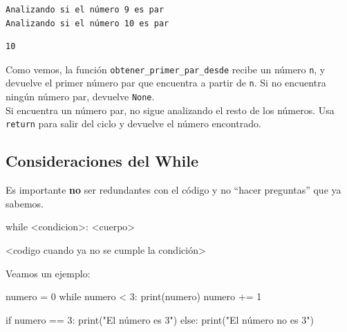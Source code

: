 \documentclass[
  letterpaper,
  DIV=11,
  numbers=noendperiod]{scrreprt}
\newenvironment{Shaded}{\begin{snugshade}}{\end{snugshade}}
\newcommand{\BuiltInTok}[1]{\textcolor[rgb]{0.00,0.23,0.31}{#1}}
\newcommand{\ControlFlowTok}[1]{\textcolor[rgb]{0.00,0.23,0.31}{#1}}
\newcommand{\DecValTok}[1]{\textcolor[rgb]{0.68,0.00,0.00}{#1}}
\newcommand{\NormalTok}[1]{\textcolor[rgb]{0.00,0.23,0.31}{#1}}
\newcommand{\OperatorTok}[1]{\textcolor[rgb]{0.37,0.37,0.37}{#1}}
\newcommand{\StringTok}[1]{\textcolor[rgb]{0.13,0.47,0.30}{#1}}
\begin{document}
\begin{verbatim}
Analizando si el número 9 es par
Analizando si el número 10 es par
\end{verbatim}

\begin{verbatim}
10
\end{verbatim}

Como vemos, la función \texttt{obtener\_primer\_par\_desde} recibe un
número \texttt{n}, y devuelve el primer número par que encuentra a
partir de \texttt{n}. Si no encuentra ningún número par, devuelve
\texttt{None}.\\
Si encuentra un número par, no sigue analizando el resto de los números.
Usa \texttt{return} para salir del ciclo y devuelve el número
encontrado.

\subsection{Consideraciones del While}\label{consideraciones-del-while}

Es importante \textbf{no} ser redundantes con el código y no ``hacer
preguntas'' que ya sabemos.

\begin{Shaded}
\begin{Highlighting}[]
\ControlFlowTok{while} \OperatorTok{\textless{}}\NormalTok{condicion}\OperatorTok{\textgreater{}}\NormalTok{:}
  \OperatorTok{\textless{}}\NormalTok{cuerpo}\OperatorTok{\textgreater{}}

\OperatorTok{\textless{}}\NormalTok{codigo cuando ya no se cumple la condición}\OperatorTok{\textgreater{}}
\end{Highlighting}
\end{Shaded}

Veamos un ejemplo:

\begin{Shaded}
\begin{Highlighting}[]
\NormalTok{numero }\OperatorTok{=} \DecValTok{0}
\ControlFlowTok{while}\NormalTok{ numero }\OperatorTok{\textless{}} \DecValTok{3}\NormalTok{:}
  \BuiltInTok{print}\NormalTok{(numero)}
\NormalTok{  numero }\OperatorTok{+=} \DecValTok{1}

\ControlFlowTok{if}\NormalTok{ numero }\OperatorTok{==} \DecValTok{3}\NormalTok{:}
  \BuiltInTok{print}\NormalTok{(}\StringTok{"El número es 3"}\NormalTok{)}
\ControlFlowTok{else}\NormalTok{:}
  \BuiltInTok{print}\NormalTok{(}\StringTok{"El número no es 3"}\NormalTok{)}
\end{Highlighting}
\end{Shaded}
\end{document}
